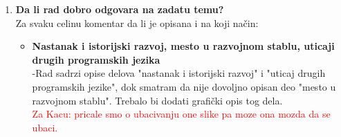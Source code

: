 \documentclass[a4paper]{report}
\newcommand{\note}[1]{\textcolor{red}{#1}}
\begin{document}
\begin{enumerate}
\item \textbf {Da li rad dobro odgovara na zadatu temu?}\\
  Za svaku celinu komentar da li je opisana i na koji na\v cin:
\begin{itemize}
   

    \item \textbf {Nastanak i istorijski razvoj, mesto u razvojnom stablu, uticaji drugih programskih jezika} \\
      -Rad sadrzi opise delova "nastanak i istorijski razvoj" i "uticaj drugih programskih jezike", dok smatram da nije dovoljno opisan deo "mesto u razvojnom stablu". Trebalo bi dodati grafi\v cki opis tog dela. \\
\note{Za Kacu: pricale smo o ubacivanju one slike pa moze ona mozda da se ubaci.}


\end{itemize}
\end{enumerate}
\end{document}
